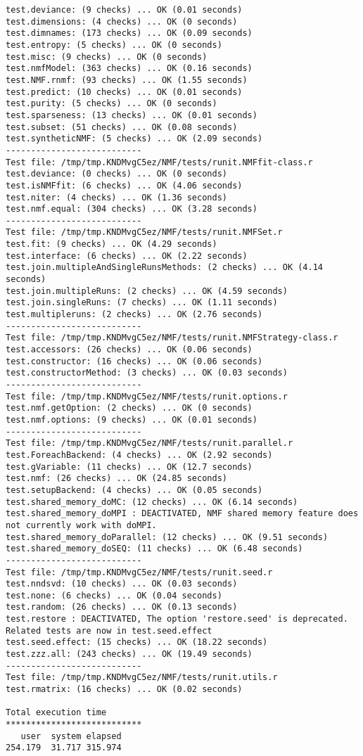 \documentclass[10pt]{article}
\begin{document}
\begin{verbatim}
test.deviance: (9 checks) ... OK (0.01 seconds)
test.dimensions: (4 checks) ... OK (0 seconds)
test.dimnames: (173 checks) ... OK (0.09 seconds)
test.entropy: (5 checks) ... OK (0 seconds)
test.misc: (9 checks) ... OK (0 seconds)
test.nmfModel: (363 checks) ... OK (0.16 seconds)
test.NMF.rnmf: (93 checks) ... OK (1.55 seconds)
test.predict: (10 checks) ... OK (0.01 seconds)
test.purity: (5 checks) ... OK (0 seconds)
test.sparseness: (13 checks) ... OK (0.01 seconds)
test.subset: (51 checks) ... OK (0.08 seconds)
test.syntheticNMF: (5 checks) ... OK (2.09 seconds)
--------------------------- 
Test file: /tmp/tmp.KNDMvgC5ez/NMF/tests/runit.NMFfit-class.r 
test.deviance: (0 checks) ... OK (0 seconds)
test.isNMFfit: (6 checks) ... OK (4.06 seconds)
test.niter: (4 checks) ... OK (1.36 seconds)
test.nmf.equal: (304 checks) ... OK (3.28 seconds)
--------------------------- 
Test file: /tmp/tmp.KNDMvgC5ez/NMF/tests/runit.NMFSet.r 
test.fit: (9 checks) ... OK (4.29 seconds)
test.interface: (6 checks) ... OK (2.22 seconds)
test.join.multipleAndSingleRunsMethods: (2 checks) ... OK (4.14 seconds)
test.join.multipleRuns: (2 checks) ... OK (4.59 seconds)
test.join.singleRuns: (7 checks) ... OK (1.11 seconds)
test.multipleruns: (2 checks) ... OK (2.76 seconds)
--------------------------- 
Test file: /tmp/tmp.KNDMvgC5ez/NMF/tests/runit.NMFStrategy-class.r 
test.accessors: (26 checks) ... OK (0.06 seconds)
test.constructor: (16 checks) ... OK (0.06 seconds)
test.constructorMethod: (3 checks) ... OK (0.03 seconds)
--------------------------- 
Test file: /tmp/tmp.KNDMvgC5ez/NMF/tests/runit.options.r 
test.nmf.getOption: (2 checks) ... OK (0 seconds)
test.nmf.options: (9 checks) ... OK (0.01 seconds)
--------------------------- 
Test file: /tmp/tmp.KNDMvgC5ez/NMF/tests/runit.parallel.r 
test.ForeachBackend: (4 checks) ... OK (2.92 seconds)
test.gVariable: (11 checks) ... OK (12.7 seconds)
test.nmf: (26 checks) ... OK (24.85 seconds)
test.setupBackend: (4 checks) ... OK (0.05 seconds)
test.shared_memory_doMC: (12 checks) ... OK (6.14 seconds)
test.shared_memory_doMPI : DEACTIVATED, NMF shared memory feature does not currently work with doMPI.
test.shared_memory_doParallel: (12 checks) ... OK (9.51 seconds)
test.shared_memory_doSEQ: (11 checks) ... OK (6.48 seconds)
--------------------------- 
Test file: /tmp/tmp.KNDMvgC5ez/NMF/tests/runit.seed.r 
test.nndsvd: (10 checks) ... OK (0.03 seconds)
test.none: (6 checks) ... OK (0.04 seconds)
test.random: (26 checks) ... OK (0.13 seconds)
test.restore : DEACTIVATED, The option 'restore.seed' is deprecated. Related tests are now in test.seed.effect
test.seed.effect: (15 checks) ... OK (18.22 seconds)
test.zzz.all: (243 checks) ... OK (19.49 seconds)
--------------------------- 
Test file: /tmp/tmp.KNDMvgC5ez/NMF/tests/runit.utils.r 
test.rmatrix: (16 checks) ... OK (0.02 seconds)

Total execution time
***************************
   user  system elapsed 
254.179  31.717 315.974 

\end{verbatim}
\end{document}
